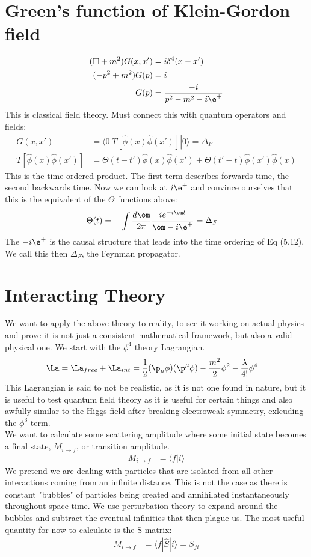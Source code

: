 \documentclass[a4paper, 11pt, normalem]{report}
\newcommand\hphi{\hat{\phi}}
\begin{document}
\section{Green's function of Klein-Gordon field}
\begin{align}
    (\Box + m^2)G(x,x') &= i\delta^4(x-x') \\
    (-p^2 + m^2)G(p) &= i \\
    G(p) &= \frac{-i}{p^2-m^2 - i\e^+}
\end{align}
This is classical field theory. 
Must connect this with quantum operators and fields:
\begin{align}
    G(x,x') &= \langle0|T[\hphi(x)\hphi(x')]|0\rangle = \Delta_F \\
    T[\hphi(x)\hphi(x')] &= \Theta(t-t')\hphi(x)\hphi(x') + \Theta(t'-t)\hphi(x')\hphi(x) 
\end{align}
This is the time-ordered product. 
The first term describes forwards time, the second backwards time. 
Now we can look at $i\e^+$ and convince ourselves that this is the equivalent of the $\Theta$ functions above:
\begin{align}
    \Theta(t) &= -\int \frac{d\om}{2\pi} \frac{ie^{-i\om t}}{\om - i\e^+} = \Delta_F
\end{align}
The $-i\e^+$ is the causal structure that leads into the time ordering of Eq (5.12).
We call this then $\Delta_F$, the Feynman propagator.

\section{Interacting Theory}
We want to apply the above theory to reality, to see it working on actual physics and prove it is not just a consistent mathematical framework, but also a valid physical one. 
We start with the $\phi^4$ theory Lagrangian.
\begin{align}
    \La &= \La_{free} + \La_{int} = \frac12(\p_\mu\phi)(\p^\mu\phi) - \frac{m^2}{2}\phi^2 - \frac{\lambda}{4!}\phi^4
\end{align}
This Lagrangian is said to not be realistic, as it is not one found in nature, but it is useful to test quantum field theory as it is useful for certain things and also awfully similar to the Higgs field after breaking electroweak symmetry, exlcuding the $\phi^3$ term. \\
We want to calculate some scattering amplitude where some initial state becomes a final state, $M_{i\to f}$, or transition amplitude.
\begin{align}
    M_{i\to f} &= \langle f|i\rangle
\end{align}
We pretend we are dealing with particles that are isolated from all other interactions coming from an infinite distance. 
This is not the case as there is constant "bubbles" of particles being created and annihilated instantaneously throughout space-time. 
We use perturbation theory to expand around the bubbles and subtract the eventual infinities that then plague us. 
The most useful quantity for now to calculate is the S-matrix:
\begin{align}
    M_{i\to f} &= \langle f|\hat{S}|i\rangle = S_{fi}
\end{align}
\end{document}
